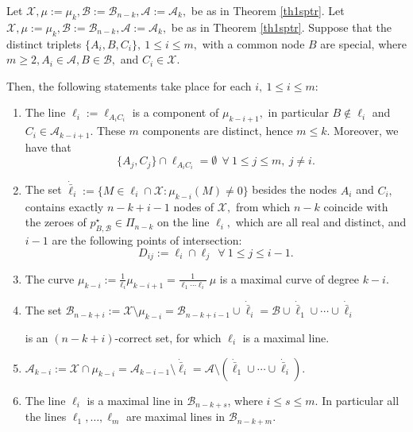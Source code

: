 \documentclass[10pt,a4paper]{amsart}
\newcommand{\Aset}{\mathcal{A}}
\newcommand{\Bset}{\mathcal{B}}
\newcommand{\Xset}{\mathcal{X}}
\begin{document}
\begin{theorem}\label{prp:m2ket}
Let $\Xset, \mu:=\mu_k, \Bset:=\Bset_{n-k},\Aset:=\Aset_{k},$ be as in Theorem \ref{th1sptr}.
Let $\Xset, \mu:=\mu_k, \Bset:=\Bset_{n-k},\Aset:=\Aset_{k},$ be as in Theorem \ref{th1sptr}. Suppose that the distinct triplets $\{A_i,B,C_i\},\  1\le i\le m,$ with a common node $B$ are special, where $m\ge 2, A_i \in \Aset, B\in \Bset,$ and $C_i \in \Xset.$ 

Then, the following statements take place for each $i,\ 1\le i\le m:$
\begin{enumerate}
\setlength{\itemsep}{0mm}
\item
The line $\ell_i:=\ell_{A_iC_i}$ is a component of $\mu_{k-i+1},$ in particular  $B\notin\ell_i$ and $C_i\in\Aset_{k-i+1}.$  These $m$ components are distinct, hence $m\le k.$ Moreover, we have that
$$\{A_j,C_j\}\cap\ell_{A_iC_i} =\emptyset\ \ \forall\ 1\le j\le m,\ j\neq i.$$
\item
The set $\dot{\bar\ell}_i:=\{M\in{\ell_i}\cap  \Xset: \mu_{k-i}(M)\neq 0\}$ besides the nodes $A_i$ and $C_i,$ contains exactly $n-k+i-1$ nodes of $\Xset,$ from which $n-k$ coincide with the zeroes of $p^\star_{B,\Bset}\in\Pi_{n-k}$ on the line $\ell_i,$ which are all real and distinct, and $i-1$ are the following points of intersection: 
$$D_{ij}:=\ell_i\cap\ell_j\ \ \forall\ 1\le j \le i-1.$$ 
\item
The curve $\mu_{k-i}:=\frac{1}{{\ell_i}}\mu_{k-i+1}=\frac{1}{\ell_1\cdots\ell_i}\ \mu$  is a maximal curve of degree $k-i.$  
\item
The set  
$\Bset_{n-k+i}:=\Xset\setminus\mu_{k-i}=\Bset_{n-k+i-1}\cup \dot{\bar\ell}_i=\Bset\cup\dot{\bar\ell}_1\cup\cdots\cup\dot{\bar\ell}_i
$ 

is an  $(n-k+i)$-correct set, for which $\ell_i$ is a maximal line.
\item
$\Aset_{k-i}:=\Xset\cap\mu_{k-i}=\Aset_{k-i-1}\setminus\dot{\bar \ell}_i=\Aset\setminus (\dot{\bar \ell}_1\cup\cdots\cup\dot{\bar \ell}_i).$ 

\item
The line $\ell_i$ is a maximal line in  $\Bset_{n-k+s}$, where $i\le s\le m.$ In particular all the lines $\ell_1,\ldots,\ell_m$ are maximal lines in $\Bset_{n-k+m}.$
 \end{enumerate}
\end{theorem}
\end{document}
